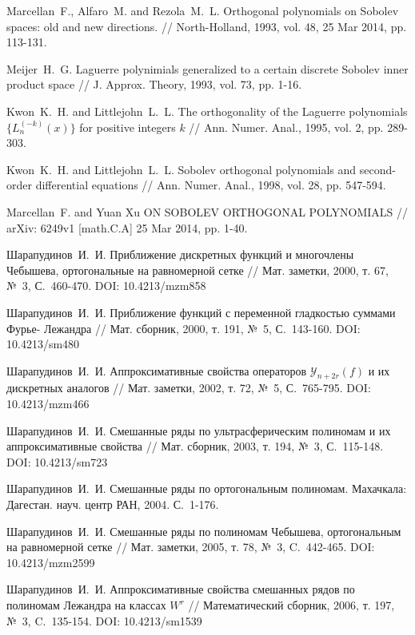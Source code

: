 \begin{thebibliography}{999}
 Marcellan~F., Alfaro~M. and Rezola~M.~L. Orthogonal polynomials on Sobolev spaces: old and new directions. // North-Holland, 1993, vol. 48, 25 Mar 2014, pp. 113-131.


 Meijer~H.~G. Laguerre polynimials generalized to a certain discrete Sobolev inner product space // J. Approx. Theory, 1993, vol. 73, pp. 1-16.


 Kwon~K.~H.  and Littlejohn~L.~L. The orthogonality of the Laguerre polynomials $\{L_n^{(-k)}(x)\}$ for positive integers $k$ // Ann. Numer. Anal., 1995, vol. 2, pp. 289-303.


 Kwon~K.~H. and Littlejohn~L.~L. Sobolev orthogonal polynomials and second-order differential equations // Ann. Numer. Anal., 1998, vol. 28, pp. 547-594.


 Marcellan~F. and Yuan Xu ON SOBOLEV ORTHOGONAL POLYNOMIALS // arXiv: 6249v1 [math.C.A] 25 Mar 2014, pp. 1-40.


 Шарапудинов~И.~И. Приближение дискретных функций и многочлены Чебышева, ортогональные на равномерной сетке // Мат. заметки, 2000, т. 67, №~3, С.~460-470. DOI: 10.4213/mzm858


 Шарапудинов~И.~И. Приближение функций с переменной гладкостью суммами Фурье- Лежандра // Мат. сборник, 2000, т. 191, №~5, С.~143-160. DOI: 10.4213/sm480


 Шарапудинов~И.~И. Аппроксимативные свойства операторов $\mathcal{Y}_{n+2r}(f)$ и их дискретных аналогов // Мат. заметки, 2002, т. 72, №~5, С.~765-795. DOI: 10.4213/mzm466


 Шарапудинов~И.~И. Смешанные ряды по ультрасферическим полиномам и их аппроксимативные свойства // Мат. сборник, 2003, т. 194, №~3, С.~115-148. DOI: 10.4213/sm723


 Шарапудинов~И.~И. Смешанные ряды по ортогональным полиномам. Махачкала: Дагестан. науч. центр РАН, 2004. С.~1-176.


 Шарапудинов~И.~И. Смешанные ряды по полиномам Чебышева, ортогональным на равномерной сетке // Мат. заметки, 2005, т. 78, №~3, C.~442-465. DOI: 10.4213/mzm2599


 Шарапудинов~И.~И. Аппроксимативные свойства смешанных рядов по полиномам Лежандра на классах $W^r$ // Математический сборник, 2006, т. 197, №~3, C.~135-154. DOI: 10.4213/sm1539



\end{thebibliography}
